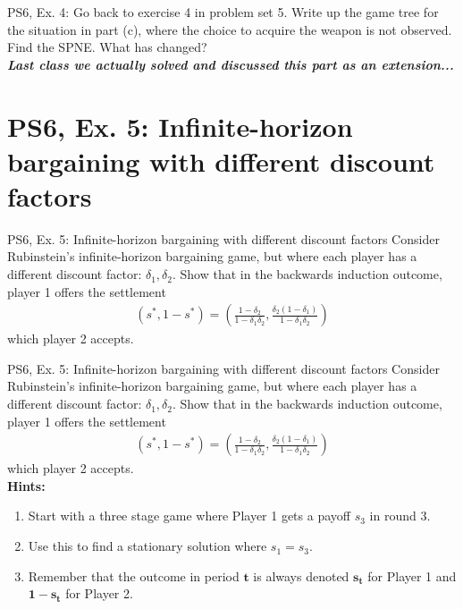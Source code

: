\begin{frame}{PS6, Ex. 4: }
    Go back to exercise 4 in problem set 5. Write up the game tree for the situation in part (c), where the choice to acquire the weapon is not observed. Find the SPNE. What has changed?\\\bigskip
    \textbf{\textit{Last class we actually solved and discussed this part as an extension...}}
\end{frame}



\section{PS6, Ex. 5: Infinite-horizon bargaining with different discount factors}

\begin{frame}{PS6, Ex. 5: Infinite-horizon bargaining with different discount factors}
    Consider Rubinstein's infinite-horizon bargaining game, but where each player has a different discount factor: $\delta_1,\delta_2$. Show that in the backwards induction outcome, player 1 offers the settlement
    \begin{align}
        (s^{*},1-s^{*})=\left( \frac{1-\delta_2}{1-\delta_1\delta_2},\frac{\delta_2(1-\delta_1)}{1-\delta_1\delta_2}\right)
    \end{align}
    which player 2 accepts.
    \vfill\null
\end{frame}
\begin{frame}{PS6, Ex. 5: Infinite-horizon bargaining with different discount factors}
    Consider Rubinstein's infinite-horizon bargaining game, but where each player has a different discount factor: $\delta_1,\delta_2$. Show that in the backwards induction outcome, player 1 offers the settlement
    \begin{align}
        (s^{*},1-s^{*})=\left( \frac{1-\delta_2}{1-\delta_1\delta_2},\frac{\delta_2(1-\delta_1)}{1-\delta_1\delta_2}\right)
    \end{align}
    which player 2 accepts.\\\medskip
    \textbf{Hints:}
    \begin{enumerate}
      \item Start with a three stage game where Player 1 gets a payoff $s_3$ in round 3.
      \item Use this to find a stationary solution where $s_1=s_3$.
      \item Remember that the outcome in period $\bm{t}$ is always denoted $\bm{s_t}$ for Player 1 and $\bm{1-s_t}$ for Player 2.
    \end{enumerate}
    \vfill\null
\end{frame}

